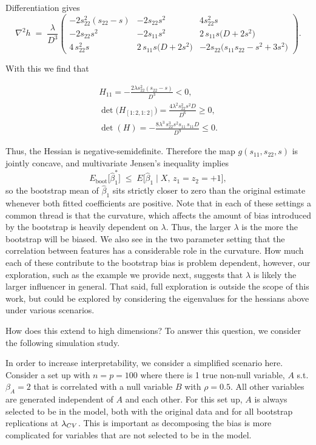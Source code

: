 \noindent Differentiation gives
$$
\nabla^{2}h \;=\; \frac{\lambda}{D^{3}}
\begin{pmatrix}
-2s_{22}^{2}(s_{22}-s) & -2s_{22}s^{2} & 4s_{22}^{2}s\\[6pt]
-2s_{22}s^{2} & -2s_{11}s^{2} & 2\,s_{11}s\bigl(D+2s^{2}\bigr)\\[6pt]
4\,s_{22}^{2}s & 2\,s_{11}s\bigl(D+2s^{2}\bigr) & -2s_{22}\bigl(s_{11}s_{22}-s^{2}+3s^{2}\bigr)
\end{pmatrix}.
$$

\noindent With this we find that

$$
\begin{aligned}
H_{11} = -\frac{2\lambda s_{22}^{2}(s_{22}-s)}{D^{3}} < 0, \\ 
\det\bigl(H_{[1:2,1:2]}\bigr) = \frac{4\lambda^{2}s_{22}^{2}s^{2}D}{D^{6}} \geq 0, \\
\det(H) = -\frac{8\lambda^{3}\,s_{22}^{3}s^{2}s_{11}\,s_{11}D}{D^{9}} \leq 0.
\end{aligned}
$$

\noindent Thus, the Hessian is negative-semidefinite.  Therefore the map $g(s_{11},s_{22},s)$ is jointly concave, and multivariate Jensen's inequality implies
$$
E_{\text{boot}}\bigl[\hat\beta_{1}^{*}\bigr]
  \;\le\; E\bigl[\hat\beta_{1}\mid X,\,z_{1}=z_{2}=+1\bigr],
$$
so the bootstrap mean of $\hat\beta_{1}$ sits strictly closer to zero than the original estimate whenever both fitted coefficients are positive. Note that in each of these settings a common thread is that the curvature, which affects the amount of bias introduced by the bootstrap is heavily dependent on $\lambda$. Thus, the larger $\lambda$ is the more the bootstrap will be biased. We also see in the two parameter setting that the correlation between features has a considerable role in the curvature. How much each of these contribute to the bootstrap bias is problem dependent, however, our exploration, such as the example we provide next, suggests that $\lambda$ is likely the larger influencer in general. That said, full exploration is outside the scope of this work, but could be explored by considering the eigenvalues for the hessians above under various scenarios.

How does this extend to high dimensions? To answer this question, we consider the following simulation study.

In order to increase interpretability, we consider a simplified scenario here. Consider a set up with $n = p = 100$ where there is 1 true non-null variable, $A$ s.t. $\beta_A = 2$ that is correlated with a null variable $B$ with $\rho = 0.5$. All other variables are generated independent of $A$ and each other. For this set up, $A$ is always selected to be in the model, both with the original data and for all bootstrap replications at $\lambda_{CV}$. This is important as decomposing the bias is more complicated for variables that are not selected to be in the model.

